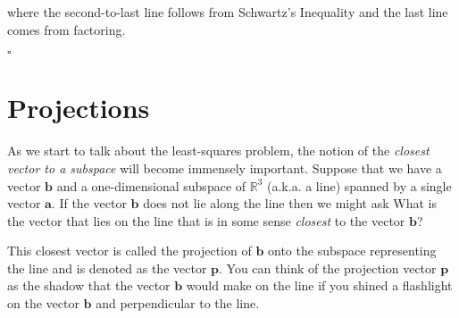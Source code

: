 \documentclass[12pt]{article}
\newcommand{\nin}{\noindent}
\newcommand{\vthree}{\vspace{3mm}}
\newcommand{\mys}[1]{\left\{ #1 \right\}}
\newcommand{\R}[1]{\mathbb{R}^{#1}}
\newcommand{\bp}{\mathbf{p}}
\newcommand{\ba}{\mathbf{a}}
\newcommand{\bfb}{\mathbf{b}}
\begin{document}
\vthree

\nin where the second-to-last line follows from Schwartz's Inequality and the last line comes from factoring.

\hfill $\square$

\clearpage

\section*{Projections}

\vthree

\nin As we start to talk about the least-squares problem, the notion of the {\it closest vector to a subspace} will become immensely important.  Suppose that we have a vector $\bfb$ and a one-dimensional subspace of $\R{3}$ (a.k.a. a line) spanned by a single vector $\ba$.  If the vector $\bfb$ does not lie along the line then we might ask What is the vector that lies on the line that is in some sense {\it closest} to the vector $\bfb$?

\nin This closest vector is called the projection of $\bfb$ onto the subspace representing the line and is denoted as the vector $\bp$.  You can think of the projection vector $\bp$ as the shadow that the vector $\bfb$ would make on the line if you shined a flashlight on the vector $\bfb$ and perpendicular to the line.

\begin{center}
\end{center}
\end{document}
